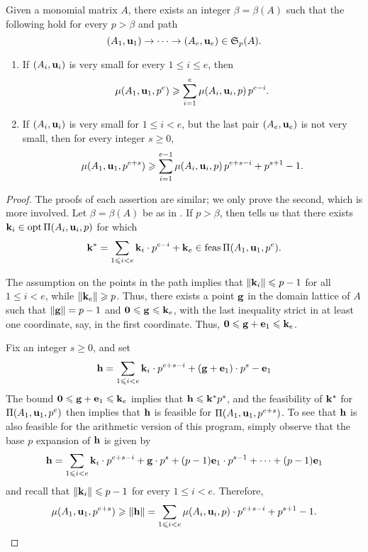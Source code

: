 \documentclass[11pt]{amsart}
\begin{document}
%
%
\begin{corollary}\label{cor: iterated lifting}
Given a monomial matrix $A$, there exists an integer $\beta = \beta(A)$ such that the following hold for every $p > \beta$ and path \[ (A_1, \mathbf{u}_1) \to \cdots \to (A_e, \mathbf{u}_e)  \in \mathfrak{S}_p(A).\]
\begin{enumerate}
\item If $(A_i, \mathbf{u}_i)$ is very small for every $1 \leq i \leq e$, then \[ \mu(A_1, \mathbf{u}_1, p^e) \geqslant \sum_{i=1}^e \mu(A_i, \mathbf{u}_i, p) \, p^{e-i}.\]
\item If $(A_i, \mathbf{u}_i)$ is very small for $1 \leq i < e$, but the last pair $(A_e, \mathbf{u}_e)$ is not very small, then for every integer $s \geq 0$,
 \[ \mu(A_1, \mathbf{u}_1, p^{e+s}) \geqslant \sum_{i=1}^{e-1} \mu(A_i, \mathbf{u}_i, p) \, p^{e+s-i} + p^{s+1}-1. \]
\end{enumerate}
\end{corollary}

\begin{proof} The proofs of each assertion are similar; we only prove the second, which is more involved.  Let $\beta = \beta(A)$ be as in .  If $p > \beta$, then  tells us that there exists $\mathbf{k}_i \in \operatorname{opt} \Pi(A_i, \mathbf{u}_i, p)$ for which \[ \mathbf{k}^{\ast} = \sum_{1 \leqslant i < e} \mathbf{k}_i \cdot p^{e-i} + \mathbf{k}_e \in \operatorname{feas} \Pi(A_1, \mathbf{u}_1, p^e).\]

  The assumption on the points in the path implies that $\| \mathbf{k}_i \| \leqslant p-1$ for all $1 \leq i < e$, while $\| \mathbf{k}_e \| \geqslant p$.  Thus, there exists a point $\mathbf{g}$ in the domain lattice of $A$ such that $\| \mathbf{g} \| = p-1$ and $\mathbf{0} \leqslant \mathbf{g} \leqslant \mathbf{k}_e$, with the last inequality strict in at least one coordinate, say, in the first coordinate.  Thus, $\mathbf{0} \leqslant \mathbf{g} + \mathbf{e}_1 \leqslant \mathbf{k}_e$.

Fix an integer $s \geq 0$, and set
%
\[ \mathbf{h} = \sum_{1 \leqslant i < e} \mathbf{k}_i \cdot p^{e+s-i} + (\mathbf{g} + \mathbf{e}_1) \cdot p^{s} - \mathbf{e}_1 \]
%
The bound $\mathbf{0} \leqslant \mathbf{g} + \mathbf{e}_1 \leqslant \mathbf{k}_e$ implies that $\mathbf{h} \leqslant \mathbf{k}^{\ast}  p^s$, and the feasibility of $\mathbf{k}^{\ast}$ for $\Pi(A_1, \mathbf{u}_1, p^e)$ then implies that  $\mathbf{h}$ is feasible for $\Pi(A_1, \mathbf{u}_1, p^{e+s})$.  To see that $\mathbf{h}$ is also feasible for the arithmetic version of this program, simply observe that the base $p$ expansion of $\mathbf{h}$ is given by
%
\[ \mathbf{h} = \sum_{1 \leqslant i < e} \mathbf{k}_i \cdot p^{e+s-i} + \mathbf{g} \cdot p^{s} + (p-1) \mathbf{e}_1 \cdot p^{s-1} + \cdots + (p-1) \mathbf{e}_1 \]
%
and recall that $\| \mathbf{k}_i \| \leqslant p-1$ for every $1 \leq i < e$.  Therefore,
%
\[ \mu(A_1, \mathbf{u}_1, p^{e+s}) \geqslant \| \mathbf{h} \| = \sum_{1 \leqslant i < e} \mu(A_i, \mathbf{u}_i, p) \cdot p^{e+s-i}+ p^{s+1}-1. \qedhere\]
%
\end{proof}
\end{document}
